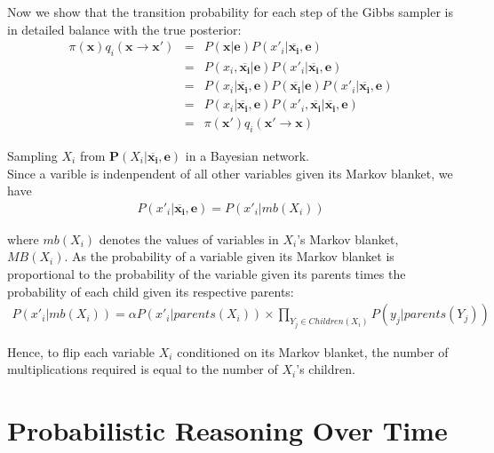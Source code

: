 \documentclass[12pt]{article}
\begin{document}
Now we show that the transition probability for each step of the Gibbs sampler is in detailed balance with the true posterior:
\begin{eqnarray*}
\pi(\boldsymbol{x}) q_i(\boldsymbol{x} \rightarrow \boldsymbol{x'})
&=& P(\boldsymbol{x}|\boldsymbol{e})
    P(x'_i| \overline{\boldsymbol{x_i}},\boldsymbol{e}) \\
&=& P(x_i, \overline{\boldsymbol{x_i}} | \boldsymbol{e})
    P(x'_i| \overline{\boldsymbol{x_i}},\boldsymbol{e}) \\
&=& P(x_i | \overline{\boldsymbol{x_i}}, \boldsymbol{e})
    P(\overline{\boldsymbol{x_i}} | \boldsymbol{e})
    P(x'_i | \overline{\boldsymbol{x_i}},\boldsymbol{e}) \\
&=& P(x_i | \overline{\boldsymbol{x_i}}, \boldsymbol{e})
    P(x'_i, \overline{\boldsymbol{x_i}} 
      | \overline{\boldsymbol{x_i}},\boldsymbol{e}) \\
&=& \pi(\boldsymbol{x'}) q_i(\boldsymbol{x'} \rightarrow \boldsymbol{x})
\end{eqnarray*}

Sampling $X_i$ from $\boldsymbol{P}(X_i | \overline{\boldsymbol{x_i}}, \boldsymbol{e})$ in a Bayesian network. \\

Since a varible is indenpendent of all other variables given its Markov blanket, we have
\begin{eqnarray*}
P(x'_i | \overline{\boldsymbol{x_i}}, \boldsymbol{e}) = P(x'_i | mb(X_i))
\end{eqnarray*}

where $mb(X_i)$ denotes the values of variables in $X_i$'s Markov blanket, $MB(X_i)$. As the probability of a variable given its Markov blanket is proportional to the probability of the variable given its parents times the probability of each child given its respective parents:
\begin{eqnarray*}
P(x'_i|mb(X_i))
= \alpha P(x'_i | parents(X_i)) \times
  \prod_{Y_j \in Children(X_i)} P(y_j | parents(Y_j))
\end{eqnarray*}

Hence, to flip each variable $X_i$ conditioned on its Markov blanket, the number of multiplications required is equal to the number of $X_i$'s children.

\section*{Probabilistic Reasoning Over Time}
\end{document}
